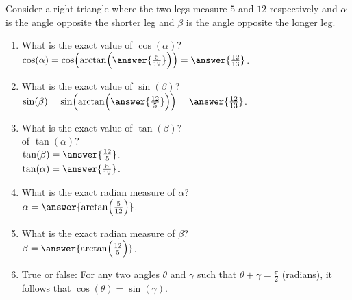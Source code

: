 \documentclass{ximera}
\author{Elizabeth Campolongo}
\begin{document}
\begin{exercise}
Consider a right triangle where the two legs measure $5$ and $12$ respectively and $\alpha$ is the angle opposite the shorter leg and $\beta$ is the angle opposite the longer leg.
%
\begin{enumerate}
\item What is the exact value of $\cos(\alpha)$? \\
$\cos(\alpha) = \cos\!\Big(\!\arctan\!\Big(\answer{\frac{5}{12}}\Big)\Big) = \answer{\frac{12}{13}}$.
%
\item What is the exact value of $\sin(\beta)$?\\
$\sin(\beta) = \sin\!\Big(\!\arctan\!\Big(\answer{\frac{12}{5}}\Big)\Big) = \answer{\frac{12}{13}}$.
%
\item What is the exact value of $\tan(\beta)$? \\ 
of $\tan(\alpha)$?\\
$\tan(\beta) = \answer{\frac{12}{5}}$. \\
$\tan(\alpha) = \answer{\frac{5}{12}}$.
%
\item What is the exact radian measure of $\alpha$?\\
$\alpha = \answer{\arctan\!\Big(\frac{5}{12}\Big)}$.
%
\item What is the exact radian measure of $\beta$?\\
$\beta = \answer{\arctan\!\Big(\frac{12}{5}\Big)}$.
%
\item True or false: For any two angles $\theta$ and $\gamma$ such that $\theta + \gamma = \frac{\pi}{2}$ (radians), it follows that $\cos(\theta) = \sin(\gamma)$.
%
\begin{multipleChoice}
\end{multipleChoice}
%
\end{enumerate}
\end{exercise}
\end{document}
